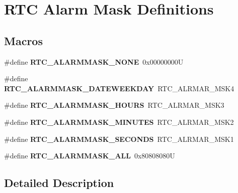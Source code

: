 \hypertarget{group___r_t_c___alarm_mask___definitions}{}\section{R\+TC Alarm Mask Definitions}
\label{group___r_t_c___alarm_mask___definitions}
\subsection*{Macros}
\begin{DoxyCompactItemize}
\item 
\mbox{\label{group___r_t_c___alarm_mask___definitions_ga051c19c4a3c3f12bcf672f35d03254ae}} 
\#define {\bfseries R\+T\+C\+\_\+\+A\+L\+A\+R\+M\+M\+A\+S\+K\+\_\+\+N\+O\+NE}~0x00000000U
\item 
\mbox{\label{group___r_t_c___alarm_mask___definitions_ga0bcc63ed1fe29a90fa8745cd3b98f73c}} 
\#define {\bfseries R\+T\+C\+\_\+\+A\+L\+A\+R\+M\+M\+A\+S\+K\+\_\+\+D\+A\+T\+E\+W\+E\+E\+K\+D\+AY}~R\+T\+C\+\_\+\+A\+L\+R\+M\+A\+R\+\_\+\+M\+S\+K4
\item 
\mbox{\label{group___r_t_c___alarm_mask___definitions_gaa8bfd0f98f4f53930a34a43af093af37}} 
\#define {\bfseries R\+T\+C\+\_\+\+A\+L\+A\+R\+M\+M\+A\+S\+K\+\_\+\+H\+O\+U\+RS}~R\+T\+C\+\_\+\+A\+L\+R\+M\+A\+R\+\_\+\+M\+S\+K3
\item 
\mbox{\label{group___r_t_c___alarm_mask___definitions_gafe9215f55d86f2f959af686539c5aa0a}} 
\#define {\bfseries R\+T\+C\+\_\+\+A\+L\+A\+R\+M\+M\+A\+S\+K\+\_\+\+M\+I\+N\+U\+T\+ES}~R\+T\+C\+\_\+\+A\+L\+R\+M\+A\+R\+\_\+\+M\+S\+K2
\item 
\mbox{\label{group___r_t_c___alarm_mask___definitions_gad404276351a285f7ede5a1ec53009353}} 
\#define {\bfseries R\+T\+C\+\_\+\+A\+L\+A\+R\+M\+M\+A\+S\+K\+\_\+\+S\+E\+C\+O\+N\+DS}~R\+T\+C\+\_\+\+A\+L\+R\+M\+A\+R\+\_\+\+M\+S\+K1
\item 
\mbox{\label{group___r_t_c___alarm_mask___definitions_gae5a5dc7b33c51c572ebc9cb58723fdd3}} 
\#define {\bfseries R\+T\+C\+\_\+\+A\+L\+A\+R\+M\+M\+A\+S\+K\+\_\+\+A\+LL}~0x80808080U
\end{DoxyCompactItemize}


\subsection{Detailed Description}

